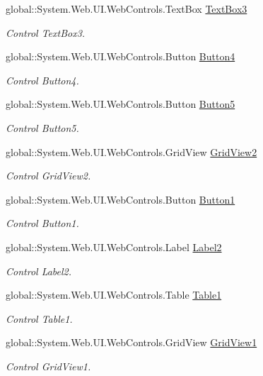 \begin{DoxyCompactItemize}
global\+::\+System.\+Web.\+U\+I.\+Web\+Controls.\+Text\+Box \mbox{\hyperlink{classInicio_1_1Registrados_a42dd2c03767d9a49a113c1c4e864d790}{Text\+Box3}}
\begin{DoxyCompactList}\small\item\em Control Text\+Box3. \end{DoxyCompactList}\item 
global\+::\+System.\+Web.\+U\+I.\+Web\+Controls.\+Button \mbox{\hyperlink{classInicio_1_1Registrados_a17ce0318c403c057f81a1d740673a57f}{Button4}}
\begin{DoxyCompactList}\small\item\em Control Button4. \end{DoxyCompactList}\item 
global\+::\+System.\+Web.\+U\+I.\+Web\+Controls.\+Button \mbox{\hyperlink{classInicio_1_1Registrados_a07302395de09db810ad8f7f096762449}{Button5}}
\begin{DoxyCompactList}\small\item\em Control Button5. \end{DoxyCompactList}\item 
global\+::\+System.\+Web.\+U\+I.\+Web\+Controls.\+Grid\+View \mbox{\hyperlink{classInicio_1_1Registrados_acf5a95ef87b37efcf6ad23cb0df13110}{Grid\+View2}}
\begin{DoxyCompactList}\small\item\em Control Grid\+View2. \end{DoxyCompactList}\item 
global\+::\+System.\+Web.\+U\+I.\+Web\+Controls.\+Button \mbox{\hyperlink{classInicio_1_1Registrados_acef829ede3774fe5a9e0cf940d35e6ef}{Button1}}
\begin{DoxyCompactList}\small\item\em Control Button1. \end{DoxyCompactList}\item 
global\+::\+System.\+Web.\+U\+I.\+Web\+Controls.\+Label \mbox{\hyperlink{classInicio_1_1Registrados_ab7c3cf09be993fe6a07f31881ba27159}{Label2}}
\begin{DoxyCompactList}\small\item\em Control Label2. \end{DoxyCompactList}\item 
global\+::\+System.\+Web.\+U\+I.\+Web\+Controls.\+Table \mbox{\hyperlink{classInicio_1_1Registrados_a0c8cbd7625175b47e930f927da038acc}{Table1}}
\begin{DoxyCompactList}\small\item\em Control Table1. \end{DoxyCompactList}\item 
global\+::\+System.\+Web.\+U\+I.\+Web\+Controls.\+Grid\+View \mbox{\hyperlink{classInicio_1_1Registrados_aad3adbb47738fefadfe5efa1dfb19b92}{Grid\+View1}}
\begin{DoxyCompactList}\small\item\em Control Grid\+View1. \end{DoxyCompactList}\end{DoxyCompactItemize}


